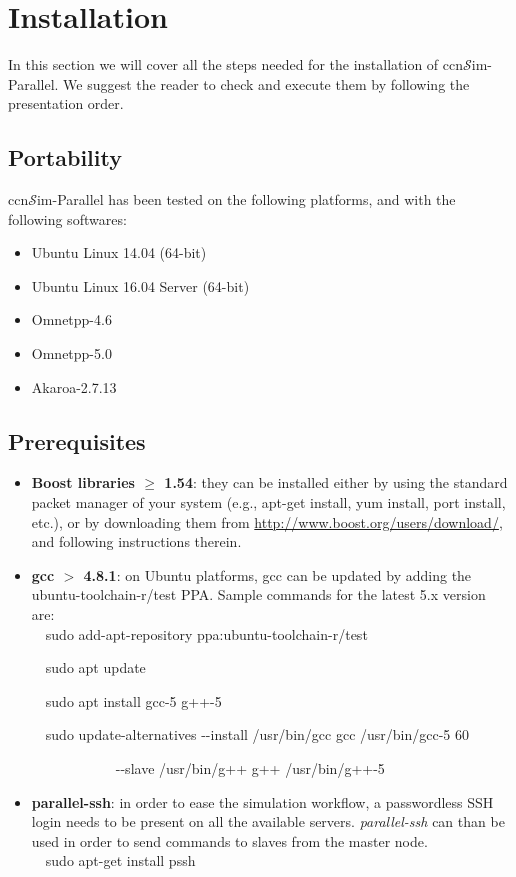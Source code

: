 \documentclass[10pt]{article}
\newcommand{\ccnsim}{ccn\ensuremath{\mathcal{S}}im} %
\newcommand{\colorboxg}[1]{{\colorbox{gray!20}{#1}}}
\begin{document}
\section*{Installation}
In this section we will cover all the steps needed for the installation of \ccnsim-Parallel. We suggest the reader to check and execute them by following the presentation order.

\subsection*{Portability}

\ccnsim-Parallel has been tested on the following platforms, and with the following softwares:
\begin{itemize}
     \item Ubuntu Linux 14.04 (64-bit)
     \item Ubuntu Linux 16.04 Server (64-bit)
     \item Omnetpp-4.6 
     \item Omnetpp-5.0 
     \item Akaroa-2.7.13 
\end{itemize}

\subsection*{Prerequisites}

 \begin{itemize}
     \item \textbf{Boost libraries $\ge$ 1.54}: they can be installed either by using the standard packet manager of your system (e.g., apt-get install, yum install, port install, etc.), or by downloading them from \url{http://www.boost.org/users/download/}, and following instructions therein.

     \item \textbf{gcc $>$ 4.8.1}: on Ubuntu platforms, gcc can be updated by adding the \colorboxg{ubuntu-toolchain-r/test} PPA. Sample commands for the latest 5.x version are: \\ 

     \ \ \colorboxg{sudo add-apt-repository ppa:ubuntu-toolchain-r/test} 

     \ \ \colorboxg{sudo apt update} 

     \ \ \colorboxg{sudo apt install gcc-5 g++-5} 
     
     \ \ \colorboxg{sudo update-alternatives -{}-install /usr/bin/gcc gcc /usr/bin/gcc-5 60}

     \ \ \ \ \ \ \ \ \ \ \ \ \colorboxg{-{}-slave /usr/bin/g++ g++ /usr/bin/g++-5}  \\

     \item \textbf{parallel-ssh}: in order to ease the simulation workflow, a passwordless SSH login needs to be present on all the available servers. \emph{parallel-ssh} can than be used in order to send commands to slaves from the master node. \\

     \ \ \colorboxg{sudo apt-get install pssh} 
\end{itemize}
\end{document}
